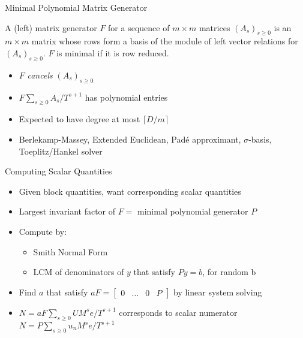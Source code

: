 \documentclass{beamer}
\begin{document}
\begin{frame}{Minimal Polynomial Matrix Generator}
	\begin{definition}
		A (left) matrix generator $F$ for a sequence of
		$m\times m$ matrices $(A_s)_{s\ge 0}$ is an
		$m\times m$ matrix
		whose rows form a basis of the module of left vector
		relations for $(A_s)_{s\ge 0}$. $F$ is minimal if
		it is row reduced.
	\end{definition}
	\begin{itemize}
		\item $F$ \textit{cancels} $(A_s)_{s\ge 0}$
		\item $F \sum_{s\ge 0} A_s/T^{s+1}$ has polynomial entries
		\item Expected to have degree at most $\lceil D/m \rceil$
		\item Berlekamp-Massey, Extended Euclidean, Pad\'e
		approximant, $\sigma$-basis, Toeplitz/Hankel solver
	\end{itemize}
\end{frame}

\begin{frame}{Computing Scalar Quantities}
	\begin{itemize}
		\item Given block quantities, want corresponding scalar quantities
		\item Largest invariant factor of $F =$
		minimal polynomial generator $P$
		\item Compute by:
		\begin{itemize}
			\item Smith Normal Form
			\item LCM of denominators of $y$ that satisfy $Py = b$, for random b
		\end{itemize}
		\item Find $a$ that satisfy $aF = \begin{bmatrix}
		0 & \dots & 0 & P
		\end{bmatrix}$ by linear system solving
		\item $N = aF \sum_{s\ge 0} U M^s e/ T^{s+1}$ corresponds to scalar
		numerator $N = P\sum_{s\ge 0} u_n M^s e/ T^{s+1}$
	\end{itemize}
\end{frame}
\end{document}
